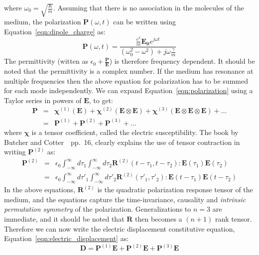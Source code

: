 \documentclass{article}[12pt]
\theoremstyle{plain}
\begin{document}
where $\omega_0=\sqrt{\frac{K}{m}}$.
Assuming that there is no association in the molecules of the medium, the polarization $\mathbf{P}(\omega,t)$
can be written using Equation~\ref{eqn:dipole_charge} as:
\begin{equation}
\mathbf{P}(\omega,t) = \frac{ \frac{e^2}{m} \mathbf{E_0}e^{j\omega t}}{(\omega_0^2-\omega^2)+j\omega\frac{\gamma}{m}}
\label{eqn:polarization}
\end{equation}
The permittivity (witten as $\epsilon_0+\frac{\mathbf{P}}{\mathbf{E}}$) is therefore frequency dependent.
It should be noted that the permittivity is a complex number. If the medium has resonance at multiple frequencies
then the above equation for polarization has to be summed for each mode independently. We can expand
Equation~\ref{eqn:polarization} using a Taylor series in powers of $\mathbf{E}$, to get:
\begin{eqnarray}
\mathbf{P} & = & \mathbf{\chi}^{(1)}(\mathbf{E}) + \mathbf{\chi}^{(2)}(\mathbf{E}\otimes\mathbf{E}) + \mathbf{\chi}^{(3)}(\mathbf{E}\otimes\mathbf{E}\otimes\mathbf{E}) + \ldots \nonumber \\
           & = & \mathbf{P}^{(1)} + \mathbf{P}^{(2)} + \mathbf{P}^{(3)} + \ldots \label{eqn:nonlinear-polarization}
\end{eqnarray}
where $\mathbf{\chi}$ is a tensor coefficient, called the electric susceptibility. 
The book by Butcher and Cotter~\cite{butcher1991elements}~pp.~16, clearly
explains the use of tensor contraction in writing $\mathbf{P}^{(2)}$ as:
\begin{eqnarray}
\mathbf{P}^{(2)} & = & \epsilon_0 \int_{-\infty}^\infty d\tau_1 \int_{-\infty}^\infty d\tau_2 \mathbf{R}^{(2)} (t-\tau_1, t-\tau_2): \mathbf{E}(\tau_1) \mathbf{E}(\tau_2) \\
& = & \epsilon_0 \int_{-\infty}^\infty d\tau'_1 \int_{-\infty}^\infty d\tau'_2 \mathbf{R}^{(2)} (\tau'_1, \tau'_2): \mathbf{E}(t-\tau_1) \mathbf{E}(t-\tau_2) 
\end{eqnarray}
In the above equations, $\mathbf{R}^{(2)}$ is the quadratic polarization
response tensor of the medium, and the equations capture the time-invariance,
causality and \emph{intrinsic permutation symmetry} of the
polarization. Generalizations to $n=3$ are immediate, and it should be
noted that $\mathbf{R}$ then becomes a $(n+1)$ rank tensor.
Therefore we can now
write the electric displacement constitutive equation, Equation~\ref{eqn:electric_displacement} as:
\begin{equation}
\mathbf{D} = \mathbf{P}^{(1)}\mathbf{E} + \mathbf{P}^{(2)}\mathbf{E} + \mathbf{P}^{(3)}\mathbf{E} 
\label{eqn:electric_displacement_2}
\end{equation}
\end{document}
